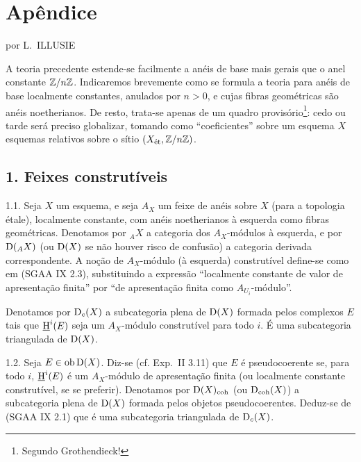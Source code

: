 \section*{Apêndice}
\begin{center}
por L.~ILLUSIE
\end{center}

A teoria precedente estende-se facilmente a anéis de base mais gerais que o anel constante $\mathbb{Z}/n\mathbb{Z}$. Indicaremos brevemente como se formula a teoria para anéis de base localmente constantes, anulados por $n>0$, e cujas fibras geométricas são anéis noetherianos. De resto, trata-se apenas de um quadro provisório\footnote{Segundo Grothendieck!}: cedo ou tarde será preciso globalizar, tomando como ``coeficientes'' sobre um esquema $X$ esquemas relativos sobre o sítio $(X_{\mathrm{\acute et}},\mathbb{Z}/n\mathbb{Z})$.

\subsection*{1. Feixes construtíveis}

1.1. Seja $X$ um esquema, e seja $A_X$ um feixe de anéis sobre $X$ (para a topologia étale), localmente constante, com anéis noetherianos à esquerda como fibras geométricas. Denotamos por ${}_A X$ a categoria dos $A_X$-módulos à esquerda, e por $\mathrm{D}({}_A X)$ (ou $\mathrm{D}(X)$ se não houver risco de confusão) a categoria derivada correspondente. A noção de $A_X$-módulo (à esquerda) construtível define-se como em (SGAA IX 2.3), substituindo a expressão ``localmente constante de valor de apresentação finita'' por ``de apresentação finita como $A_{U_i}$-módulo''.

Denotamos por $\mathrm{D}_c(X)$ a subcategoria plena de $\mathrm{D}(X)$ formada pelos complexos $E$ tais que $\underline{\mathrm H}^i(E)$ seja um $A_X$-módulo construtível para todo $i$. É uma subcategoria triangulada de $\mathrm{D}(X)$.

1.2. Seja $E\in\operatorname{ob}\mathrm{D}(X)$. Diz-se (cf. Exp.~II 3.11) que $E$ é pseudocoerente se, para todo $i$, $\underline{\mathrm H}^i(E)$ é um $A_X$-módulo de apresentação finita (ou localmente constante construtível, se se preferir). Denotamos por $\mathrm{D}(X)_{\mathrm{coh}}$ (ou $\mathrm{D}_{\mathrm{coh}}(X)$) a subcategoria plena de $\mathrm{D}(X)$ formada pelos objetos pseudocoerentes. Deduz-se de (SGAA IX 2.1) que é uma subcategoria triangulada de $\mathrm{D}_c(X)$.

